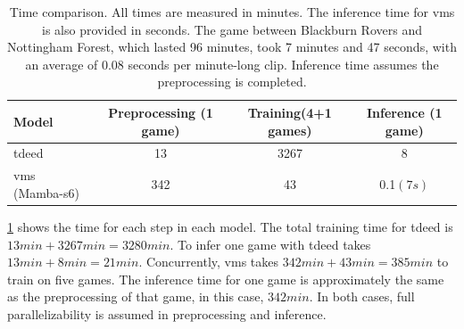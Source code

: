 \begin{table}
    \centering
    \begin{tabular}{lccc}
        \toprule 
        Model & Preprocessing (1 game)  & Training(4+1 games) & Inference (1 game) \\
        \midrule
        \acrshort{tdeed} & 13 & 3267 & 8\\
        \acrshort{vms} (Mamba-\acrshort{s6}) & 342 & 43 & 0.1$(7s)$ \\
        \bottomrule
    \end{tabular}
    \caption{Time comparison. All times are measured in minutes. The inference time for \acrshort{vms} is also provided in seconds. The game between Blackburn Rovers and Nottingham Forest, which lasted 96 minutes, took 7 minutes and 47 seconds, with an average of 0.08 seconds per minute-long clip. Inference time assumes the preprocessing is completed.}
    \label{tab:results_ex2}
\end{table}

\cref{tab:results_ex2} shows the time for each step in each model. The total training time for \acrshort{tdeed} is \(13min+3267min= 3280min\). To infer one game with \acrshort{tdeed} takes \(13min + 8min = 21min \). Concurrently, \acrshort{vms} takes \(342min+43min=385min\) to train on five games. The inference time for one game is approximately the same as the preprocessing of that game, in this case, \(342min\). In both cases, full parallelizability is assumed in preprocessing and inference. 

